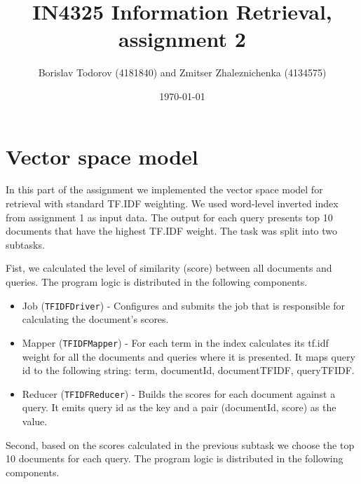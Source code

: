 \documentclass[a4paper, notitlepage]{article}
\begin{document}
\title{IN4325 Information Retrieval, assignment 2}
\author{Borislav Todorov (4181840) and Zmitser Zhaleznichenka (4134575)}
\date{\today}
\maketitle

\section{Vector space model}
In this part of the assignment we implemented the vector space model for retrieval with standard TF.IDF weighting. We used word-level inverted index from assignment 1 as input data. The output for each query presents top 10 documents that have the highest TF.IDF weight. The task was split into two subtasks.

Fist, we calculated the level of similarity (score) between all documents and queries. The program logic is distributed in the following components.

\begin{itemize}
	\item Job (\lstinline{TFIDFDriver}) - Configures and submits the job that is responsible for calculating the document's scores.
	\item Mapper (\lstinline{TFIDFMapper}) - For each term in the index  calculates its tf.idf weight for all the documents and queries where it is presented. It maps query id to the following string: term, documentId, documentTFIDF, queryTFIDF.
	\item Reducer (\lstinline{TFIDFReducer}) - Builds the scores for each document against a query. It emits query id as the key and a pair (documentId, score) as the value. 
\end{itemize}

Second, based on the scores calculated in the previous subtask we choose the top 10 documents for each query. The program logic is distributed in the following components.
\end{document}
